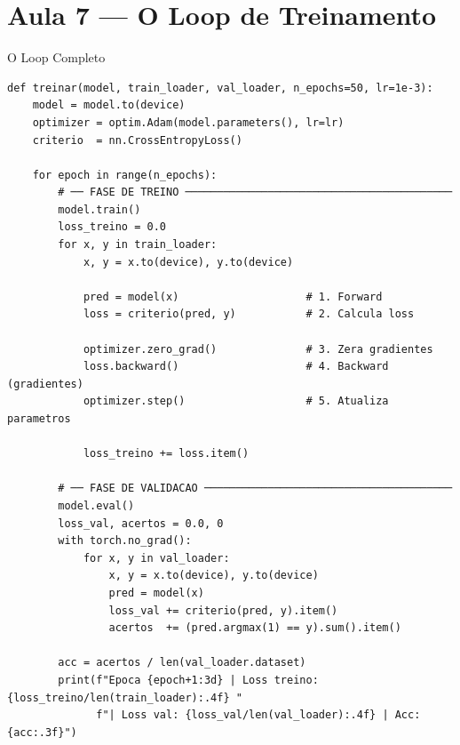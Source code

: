 \documentclass[aspectratio=169, 10pt]{beamer}
\begin{document}
\section{Aula 7 — O Loop de Treinamento}

\begin{frame}[fragile]{O Loop Completo}
\begin{lstlisting}[style=small]
def treinar(model, train_loader, val_loader, n_epochs=50, lr=1e-3):
    model = model.to(device)
    optimizer = optim.Adam(model.parameters(), lr=lr)
    criterio  = nn.CrossEntropyLoss()

    for epoch in range(n_epochs):
        # ── FASE DE TREINO ──────────────────────────────────────────
        model.train()
        loss_treino = 0.0
        for x, y in train_loader:
            x, y = x.to(device), y.to(device)

            pred = model(x)                    # 1. Forward
            loss = criterio(pred, y)           # 2. Calcula loss

            optimizer.zero_grad()              # 3. Zera gradientes
            loss.backward()                    # 4. Backward (gradientes)
            optimizer.step()                   # 5. Atualiza parametros

            loss_treino += loss.item()

        # ── FASE DE VALIDACAO ───────────────────────────────────────
        model.eval()
        loss_val, acertos = 0.0, 0
        with torch.no_grad():
            for x, y in val_loader:
                x, y = x.to(device), y.to(device)
                pred = model(x)
                loss_val += criterio(pred, y).item()
                acertos  += (pred.argmax(1) == y).sum().item()

        acc = acertos / len(val_loader.dataset)
        print(f"Epoca {epoch+1:3d} | Loss treino: {loss_treino/len(train_loader):.4f} "
              f"| Loss val: {loss_val/len(val_loader):.4f} | Acc: {acc:.3f}")
\end{lstlisting}
\end{frame}

\end{document}
